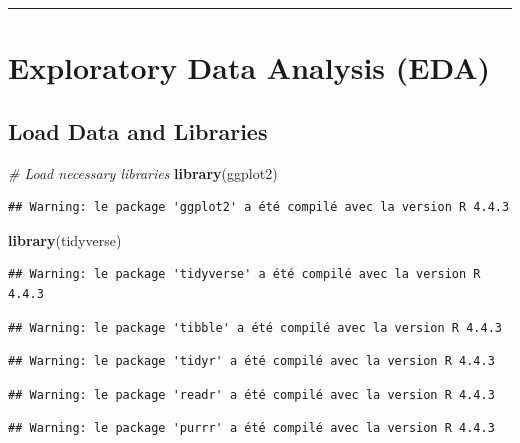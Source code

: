\documentclass[
  12pt,
]{article}
\newenvironment{Shaded}{\begin{snugshade}}{\end{snugshade}}
\newcommand{\CommentTok}[1]{\textcolor[rgb]{0.56,0.35,0.01}{\textit{#1}}}
\newcommand{\FunctionTok}[1]{\textcolor[rgb]{0.13,0.29,0.53}{\textbf{#1}}}
\newcommand{\NormalTok}[1]{#1}
\begin{document}
\begin{center}\rule{0.5\linewidth}{0.5pt}\end{center}

\section{Exploratory Data Analysis
(EDA)}\label{exploratory-data-analysis-eda}

\subsection{Load Data and Libraries}\label{load-data-and-libraries}

\begin{Shaded}
\begin{Highlighting}[]
\CommentTok{\# Load necessary libraries}
\FunctionTok{library}\NormalTok{(ggplot2)}
\end{Highlighting}
\end{Shaded}

\begin{verbatim}
## Warning: le package 'ggplot2' a été compilé avec la version R 4.4.3
\end{verbatim}

\begin{Shaded}
\begin{Highlighting}[]
\FunctionTok{library}\NormalTok{(tidyverse)}
\end{Highlighting}
\end{Shaded}

\begin{verbatim}
## Warning: le package 'tidyverse' a été compilé avec la version R 4.4.3
\end{verbatim}

\begin{verbatim}
## Warning: le package 'tibble' a été compilé avec la version R 4.4.3
\end{verbatim}

\begin{verbatim}
## Warning: le package 'tidyr' a été compilé avec la version R 4.4.3
\end{verbatim}

\begin{verbatim}
## Warning: le package 'readr' a été compilé avec la version R 4.4.3
\end{verbatim}

\begin{verbatim}
## Warning: le package 'purrr' a été compilé avec la version R 4.4.3
\end{verbatim}
\end{document}
